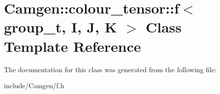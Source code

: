 \hypertarget{a00217}{}\section{Camgen\+:\+:colour\+\_\+tensor\+:\+:f$<$ group\+\_\+t, I, J, K $>$ Class Template Reference}
\label{a00217}


The documentation for this class was generated from the following file\+:\begin{DoxyCompactItemize}
\item 
include/\+Camgen/f.\+h\end{DoxyCompactItemize}
